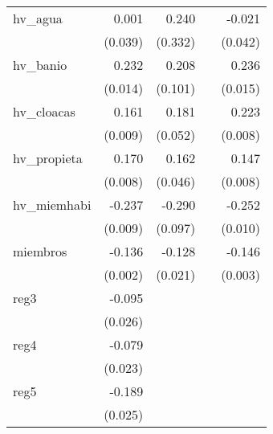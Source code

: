 {\begin{longtable}{l*{4}{D{.}{.}{-1}}}
\addlinespace
hv\_agua     &       0.001         &       0.240         &                     &      -0.021         \\
            &     (0.039)         &     (0.332)         &                     &     (0.042)         \\
\addlinespace
hv\_banio    &       0.232\sym{***}&       0.208\sym{*}  &                     &       0.236\sym{***}\\
            &     (0.014)         &     (0.101)         &                     &     (0.015)         \\
\addlinespace
hv\_cloacas  &       0.161\sym{***}&       0.181\sym{***}&                     &       0.223\sym{***}\\
            &     (0.009)         &     (0.052)         &                     &     (0.008)         \\
\addlinespace
hv\_propieta &       0.170\sym{***}&       0.162\sym{***}&                     &       0.147\sym{***}\\
            &     (0.008)         &     (0.046)         &                     &     (0.008)         \\
\addlinespace
hv\_miemhabi &      -0.237\sym{***}&      -0.290\sym{**} &                     &      -0.252\sym{***}\\
            &     (0.009)         &     (0.097)         &                     &     (0.010)         \\
\addlinespace
miembros    &      -0.136\sym{***}&      -0.128\sym{***}&                     &      -0.146\sym{***}\\
            &     (0.002)         &     (0.021)         &                     &     (0.003)         \\
\addlinespace
reg3        &      -0.095\sym{***}&                     &                     &                     \\
            &     (0.026)         &                     &                     &                     \\
\addlinespace
reg4        &      -0.079\sym{***}&                     &                     &                     \\
            &     (0.023)         &                     &                     &                     \\
\addlinespace
reg5        &      -0.189\sym{***}&                     &                     &                     \\
            &     (0.025)         &                     &                     &                     \\

\end{longtable}}
